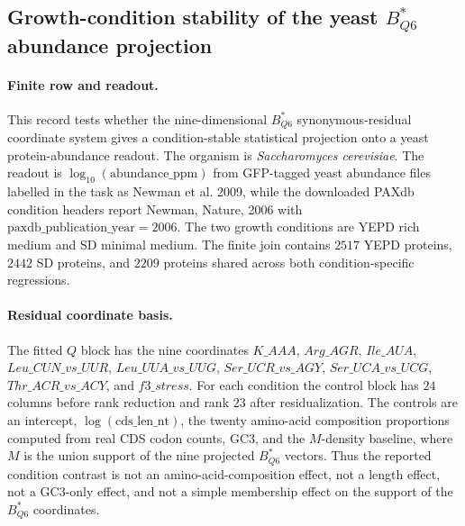 \subsection{Growth-condition stability of the yeast $B^{\ast}_{Q6}$ abundance projection}\label{sec:bioreality-q6-growth-condition-sqp}

\paragraph{Finite row and readout.}
This record tests whether the nine-dimensional $B^{\ast}_{Q6}$ synonymous-residual coordinate system gives a condition-stable statistical projection onto a yeast protein-abundance readout.  The organism is \emph{Saccharomyces cerevisiae}.  The readout is $\log_{10}(\mathrm{abundance\_ppm})$ from GFP-tagged yeast abundance files labelled in the task as Newman et al. 2009, while the downloaded PAXdb condition headers report Newman, Nature, 2006 with $\mathrm{paxdb\_publication\_year}=2006$.  The two growth conditions are YEPD rich medium and SD minimal medium.  The finite join contains $2517$ YEPD proteins, $2442$ SD proteins, and $2209$ proteins shared across both condition-specific regressions.

\paragraph{Residual coordinate basis.}
The fitted $Q$ block has the nine coordinates
$K\_AAA$, $Arg\_AGR$, $Ile\_AUA$, $Leu\_CUN\_vs\_UUR$, $Leu\_UUA\_vs\_UUG$, $Ser\_UCR\_vs\_AGY$, $Ser\_UCA\_vs\_UCG$, $Thr\_ACR\_vs\_ACY$, and $f3\_stress$.
For each condition the control block has $24$ columns before rank reduction and rank $23$ after residualization.  The controls are an intercept, $\log(\mathrm{cds\_len\_nt})$, the twenty amino-acid composition proportions computed from real CDS codon counts, GC3, and the $M$-density baseline, where $M$ is the union support of the nine projected $B^{\ast}_{Q6}$ vectors.  Thus the reported condition contrast is not an amino-acid-composition effect, not a length effect, not a GC3-only effect, and not a simple membership effect on the support of the $B^{\ast}_{Q6}$ coordinates.

